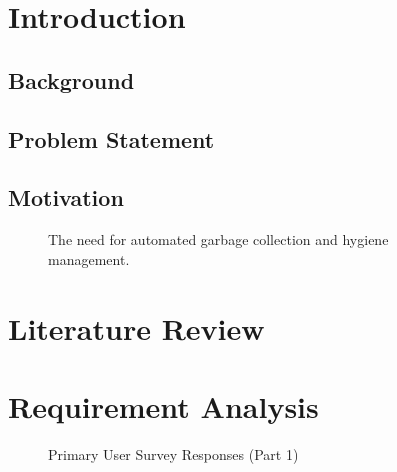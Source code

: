 \documentclass[12pt,a4paper]{report}
\begin{document}
\setcounter{page}{1}

\chapter{Introduction}

\section{Background}

\section{Problem Statement}

\section{Motivation}

\begin{figure}[ht]
\centering
\vspace{6cm}
\caption{The need for automated garbage collection and hygiene management.}
\end{figure}


\chapter{Literature Review}

\chapter{Requirement Analysis}


\begin{figure}[ht]
\centering
\vspace{6cm}
\caption{Primary User Survey Responses (Part 1)}
\end{figure}
\end{document}
